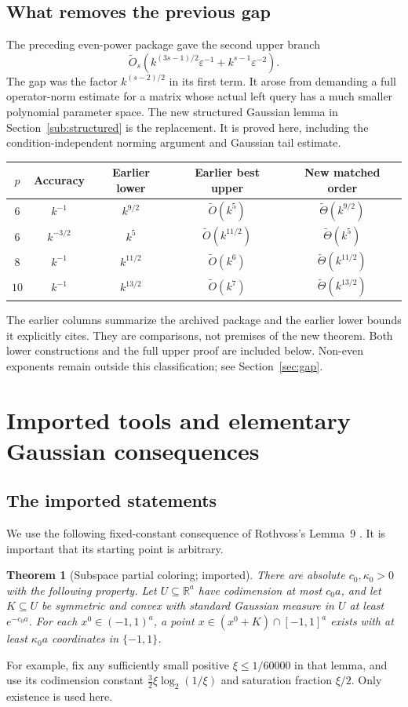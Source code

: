\documentclass[11pt]{article}
\newtheorem{theorem}{Theorem}[section]
\theoremstyle{remark}\newtheorem{remark}[theorem]{Remark}
\newcommand{\R}{\mathbb R}\newcommand{\E}{\mathbb E}\newcommand{\Prob}{\mathbb P}
\newcommand{\eps}{\varepsilon}\newcommand{\Sym}{\operatorname{Sym}}
\begin{document}
\subsection{What removes the previous gap}
The preceding even-power package \cite{prior} gave the second upper branch
\[
 \widetilde O_s(k^{(3s-1)/2}\eps^{-1}+k^{s-1}\eps^{-2}).
\]
The gap was the factor $k^{(s-2)/2}$ in its first term. It arose from demanding a full operator-norm estimate for a matrix whose actual left query has a much smaller polynomial parameter space. The new structured Gaussian lemma in Section~\ref{sub:structured} is the replacement. It is proved here, including the condition-independent norming argument and Gaussian tail estimate.

\begin{center}
\begin{tabular}{ccccc}
\toprule
$p$ & Accuracy & Earlier lower & Earlier best upper & New matched order\\
\midrule
$6$ & $k^{-1}$ & $k^{9/2}$ & $\widetilde O(k^5)$ & $\widetilde\Theta(k^{9/2})$\\
$6$ & $k^{-3/2}$ & $k^5$ & $\widetilde O(k^{11/2})$ & $\widetilde\Theta(k^5)$\\
$8$ & $k^{-1}$ & $k^{11/2}$ & $\widetilde O(k^6)$ & $\widetilde\Theta(k^{11/2})$\\
$10$ & $k^{-1}$ & $k^{13/2}$ & $\widetilde O(k^7)$ & $\widetilde\Theta(k^{13/2})$\\
\bottomrule
\end{tabular}
\end{center}
The earlier columns summarize the archived package and the earlier lower bounds it explicitly cites. They are comparisons, not premises of the new theorem. Both lower constructions and the full upper proof are included below. Non-even exponents remain outside this classification; see Section~\ref{sec:gap}.

\section{Imported tools and elementary Gaussian consequences}\label{sec:tools}
\subsection{The imported statements}
We use the following fixed-constant consequence of Rothvoss's Lemma~9 \cite{rothvoss}. It is important that its starting point is arbitrary.
\begin{theorem}[Subspace partial coloring; imported]\label{thm:pc}
There are absolute $c_0,\kappa_0>0$ with the following property. Let $U\subseteq\R^a$ have codimension at most $c_0a$, and let $K\subseteq U$ be symmetric and convex with standard Gaussian measure in $U$ at least $e^{-c_0a}$. For each $x^0\in(-1,1)^a$, a point $x\in(x^0+K)\cap[-1,1]^a$ exists with at least $\kappa_0a$ coordinates in $\{-1,1\}$.
\end{theorem}
For example, fix any sufficiently small positive $\xi\le1/60000$ in that lemma, and use its codimension constant $\frac32\xi\log_2(1/\xi)$ and saturation fraction $\xi/2$. Only existence is used here.
\end{document}
